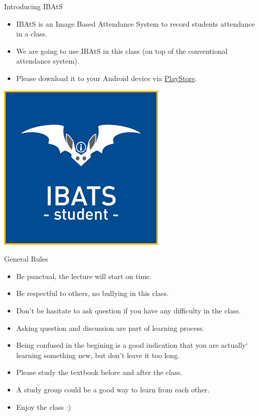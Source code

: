 \documentclass[ignorenonframetext,]{beamer}
\providecommand{\tightlist}{%
  \setlength{\itemsep}{0pt}\setlength{\parskip}{0pt}}
\begin{document}
\begin{frame}{Introducing IBAtS}
\protect\hypertarget{introducing-ibats}{}

\begin{itemize}
\tightlist
\item
  IBAtS is an Image Based Attendance System to record students
  attendance in a class.
\item
  We are going to use IBAtS in this class (on top of the conventional
  attendance system).
\item
  Please download it to your Android device via
  \href{https://play.google.com/store/apps/details?id=iBatsForStudent.Android}{PlayStore}.
\end{itemize}

\includegraphics{./Introduction-figure/ibats.png}

\end{frame}

\begin{frame}{General Rules}
\protect\hypertarget{general-rules}{}

\begin{itemize}
\tightlist
\item
  Be punctual, the lecture will start on time.
\item
  Be respectful to others, no bullying in this class.
\item
  Don't be hasitate to ask question if you have any difficulty in the
  class.
\item
  Asking question and discussion are part of learning process.
\item
  Being confused in the begining is a good indication that you are
  actually` learning something new, but don't leave it too long.
\item
  Please study the textbook before and after the class.
\item
  A study group could be a good way to learn from each other.
\item
  Enjoy the class :)
\end{itemize}

\end{frame}
\end{document}
